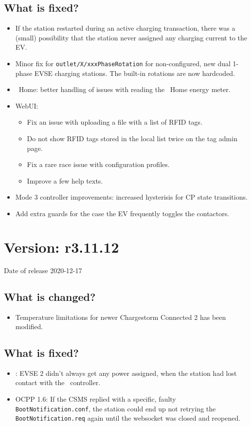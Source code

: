 \documentclass{scrartcl}
\begin{document}
\subsection*{What is fixed?}
\begin{itemize}
\item If the station restarted during an active charging transaction, there
  was a (small) possibility that the station never assigned any charging
  current to the EV.
\item Minor fix for \verb|outlet/X/xxxPhaseRotation| for non-configured, new
  dual 1-phase EVSE charging stations. The built-in rotations are now
  hardcoded.
\item \nanogrid\ Home: better handling of issues with reading the \nanogrid\
  Home energy meter.
\item WebUI:
  \begin{itemize}
  \item Fix an issue with uploading a file with a list of RFID tags.
  \item Do not show RFID tags stored in the local list twice on the tag admin page.
  \item Fix a rare race issue with configuration profiles.
  \item Improve a few help texts.
  \end{itemize}
\item Mode 3 controller improvements: increased hysterisis for CP state
  transitions.
\item Add extra guards for the case the EV frequently toggles the contactors.
\end{itemize}

\section{Version: r3.11.12}
Date of release 2020-12-17
\subsection*{What is changed?}
\begin{itemize}
\item Temperature limitations for newer Chargestorm Connected 2 has been
  modified.
\end{itemize}
\subsection*{What is fixed?}
\begin{itemize}
\item \nanogrid: EVSE 2 didn't always get any power assigned, when the station
  had lost contact with the \nanogrid\ controller.
\item OCPP  1.6: If the CSMS replied with a specific, faulty
  \verb|BootNotification.conf|, the station could end up not retrying the
  \verb|BootNotification.req| again until the websocket was closed and
  reopened.
\end{itemize}
\end{document}
